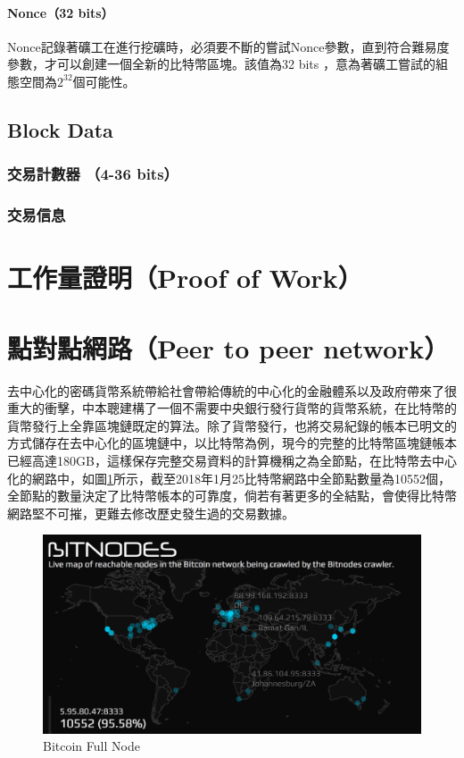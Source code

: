 			\paragraph{Nonce（32 bits）}Nonce記錄著礦工在進行挖礦時，必須要不斷的嘗試Nonce參數，直到符合難易度參數，才可以創建一個全新的比特幣區塊。該值為32 bits ，意為著礦工嘗試的組態空間為$2^{32}$個可能性。


		\subsection{Block Data}
			\subsubsection{交易計數器 （4-36 bits）}
			\subsubsection{交易信息}

	\section{工作量證明（Proof of Work）}
	\section{點對點網路（Peer to peer network）}

	去中心化的密碼貨幣系統帶給社會帶給傳統的中心化的金融體系以及政府帶來了很重大的衝擊，中本聰建構了一個不需要中央銀行發行貨幣的貨幣系統，在比特幣的貨幣發行上全靠區塊鏈既定的算法。除了貨幣發行，也將交易紀錄的帳本已明文的方式儲存在去中心化的區塊鏈中，以比特幣為例，現今的完整的比特幣區塊鏈帳本已經高達180GB，這樣保存完整交易資料的計算機稱之為全節點，在比特幣去中心化的網路中，如圖\ref{bitcoinfullnode}所示，截至2018年1月25比特幣網路中全節點數量為10552個\supercite{bitcoinfullnode}，全節點的數量決定了比特幣帳本的可靠度，倘若有著更多的全結點，會使得比特幣網路堅不可摧，更難去修改歷史發生過的交易數據。

	\begin{figure}
		\centering
		\includegraphics[width = .9\textwidth]{bitcoinfullnode.png}
		\caption{Bitcoin Full Node\supercite{bitcoinfullnode}}\label{bitcoinfullnode}
	\end{figure}

